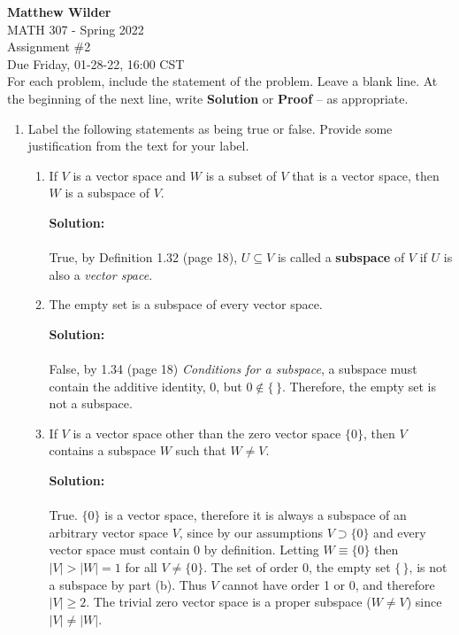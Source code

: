 \documentclass[12pt]{article}
\renewcommand{\emptyset}{\{\,\}}
\begin{document}
\pagestyle{fancy}
\fancyhf{}

\noindent \textbf{Matthew Wilder}\\MATH 307 - Spring 2022 \\
Assignment \#2 \\
Due Friday, 01-28-22, 16:00 CST \\

For each problem, include the statement of the problem. Leave a blank line.  At the beginning of the next line, write \textbf{Solution} or \textbf{Proof} -- as appropriate.
\begin{enumerate}
\item Label the following statements as being true or false.
Provide some justification from the text for your label.
    \begin{enumerate}
        \item  If $V$ is a vector space and $W$ is a subset of $V$ that is a vector space, then $W$ is a subspace of $V$.
        \begin{mybox}
            \textbf{Solution:}\\\\True, by Definition 1.32 (page 18), $U \subseteq V$ is called a \textbf{subspace} of $V$ if $U$ is also a \textit{vector space}.
        \end{mybox}
        \vspace{0.5in}
        \item The empty set is a subspace of every vector space.
        \begin{mybox}
            \textbf{Solution:}\\\\False, by 1.34 (page 18) \textit{Conditions for a subspace}, a subspace must contain the additive identity, $0$, but $0 \not \in \emptyset$. Therefore, the empty set is not a subspace.
        \end{mybox}
        \vspace{0.5in}
        \item If $V$ is a vector space other than the zero vector space $\{0\}$, then $V$ contains a subspace $W$ such that $W \ne V$.
        \begin{mybox}
            \textbf{Solution:}\\\\True. $\{0\}$ is a vector space, therefore it is always a subspace of an arbitrary vector space $V$, since by our assumptions $V \supset \{0\}$ and every vector space must contain 0 by definition. Letting $W \equiv \{0\}$ then $|V| > |W| = 1$ for all $V \not = \{0\}$. The set of order 0, the empty set $\emptyset$, is not a subspace by part (b). Thus $V$ cannot have order 1 or 0, and therefore $|V| \geq 2$. The trivial zero vector space is a proper subspace ($W \neq V$) since $|V| \neq |W|$.

\end{mybox}
\end{enumerate}
\end{enumerate}
\end{document}
